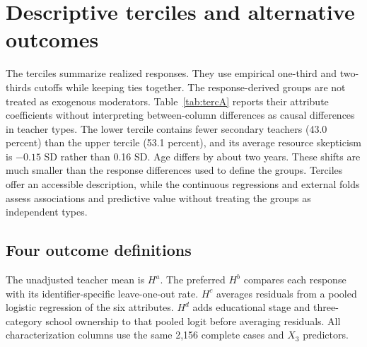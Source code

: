 \section{Descriptive terciles and alternative outcomes}\label{app:terciles}
The terciles summarize realized responses. They use empirical one-third and two-thirds cutoffs while keeping ties together. The response-derived groups are not treated as exogenous moderators. Table~\ref{tab:tercA} reports their attribute coefficients without interpreting between-column differences as causal differences in teacher types.
The lower tercile contains fewer secondary teachers (43.0 percent) than the upper tercile (53.1 percent), and its average resource skepticism is $-0.15$ SD rather than 0.16 SD. Age differs by about two years. These shifts are much smaller than the response differences used to define the groups. Terciles offer an accessible description, while the continuous regressions and external folds assess associations and predictive value without treating the groups as independent types.

\subsection{Four outcome definitions}
The unadjusted teacher mean is $H^a$. The preferred $H^b$ compares each response with its identifier-specific leave-one-out rate. $H^c$ averages residuals from a pooled logistic regression of the six attributes. $H^d$ adds educational stage and three-category school ownership to that pooled logit before averaging residuals. All characterization columns use the same 2,156 complete cases and $X_3$ predictors.

{\scriptsize{}}

